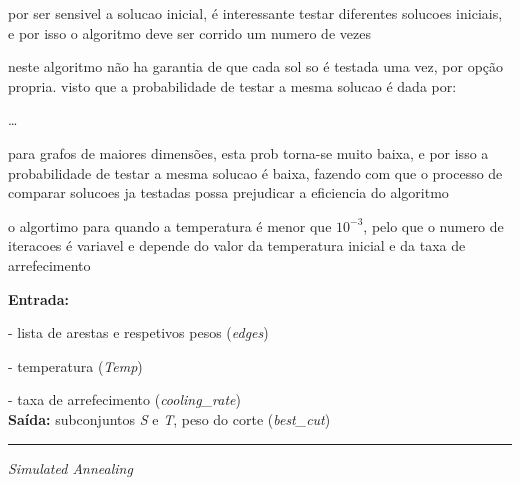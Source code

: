 \documentclass[mirror, portugues]{revdetua}
\begin{document}
por ser sensivel a solucao inicial, é interessante testar diferentes solucoes iniciais, e por isso o algoritmo deve ser corrido um numero de vezes

neste algoritmo não ha garantia de que cada sol so é testada uma vez, por opção propria. visto que a probabilidade de testar a mesma solucao é dada por:

\dots

para grafos de maiores dimensões, esta prob torna-se muito baixa, e por isso a probabilidade de testar a mesma solucao é baixa, fazendo com que o processo de comparar solucoes ja testadas possa prejudicar a eficiencia do algoritmo 

o algortimo para quando a temperatura é menor que $10^{-3}$, pelo que o numero de iteracoes é variavel e depende do valor da temperatura inicial e da taxa de arrefecimento

\begin{algorithm}[H]
\raggedright
\textbf{Entrada:}

- lista de arestas e respetivos pesos (\textit{edges})

- temperatura (\textit{Temp})

- taxa de arrefecimento (\textit{cooling\_rate})\\
\textbf{Saída:} subconjuntos \textit{S} e \textit{T}, peso do corte (\textit{best\_cut}) \\
\hrule 
\caption{\textit{Simulated Annealing}}
\end{algorithm}
\end{document}
